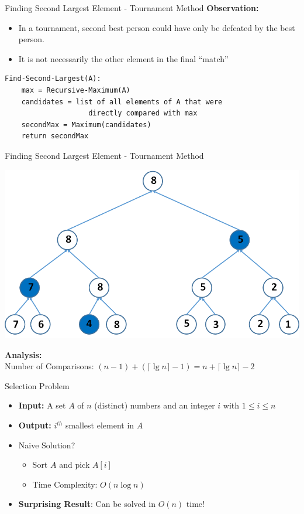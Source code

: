 \documentclass{beamer}
\begin{document}
\begin{frame}[fragile]{Finding Second Largest Element - Tournament Method}
\pause
{\bf Observation:} 
\begin{itemize}
\item In a tournament, second best person could have only be defeated by the best person. 
\item It is not necessarily the other element in the final ``match''
\end{itemize}

\begin{verbatim}
Find-Second-Largest(A):
    max = Recursive-Maximum(A)
    candidates = list of all elements of A that were 
                    directly compared with max
    secondMax = Maximum(candidates)
    return secondMax
\end{verbatim}
\end{frame}


\begin{frame}[fragile]{Finding Second Largest Element - Tournament Method}
\begin{center}
    \includegraphics[scale=0.4]{tournamentMethod.png}
\end{center}

{\bf Analysis:} \\
\pause
Number of Comparisons: $ (n-1) + ( \lceil \lg n \rceil - 1) = n +  \lceil \lg n \rceil - 2$
\end{frame}



\begin{frame}{Selection Problem}
\begin{itemize}
\item {\bf Input:} A set $A$ of $n$ (distinct) numbers and an integer $i$ with $1 \leq i \leq n$
\item {\bf Output:} $i^{th}$ smallest element in $A$ 
\item Naive Solution?
\begin{itemize}
    \item Sort $A$ and pick $A[i]$
    \item Time Complexity: $O(n \log n)$
\end{itemize}
\item {\bf Surprising Result}: Can be solved in $O(n)$ time!
\end{itemize}
\end{frame}
\end{document}
